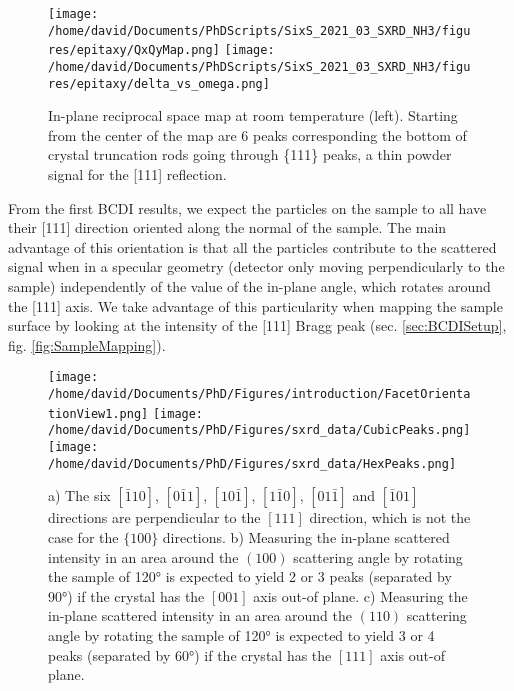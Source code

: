 \begin{figure}[!htb]
    \centering
    \texttt{[image: /home/david/Documents/PhDScripts/SixS\_2021\_03\_SXRD\_NH3/figures/epitaxy/QxQyMap.png]}
    \texttt{[image: /home/david/Documents/PhDScripts/SixS\_2021\_03\_SXRD\_NH3/figures/epitaxy/delta\_vs\_omega.png]}
    \caption{
        In-plane reciprocal space map at room temperature (left).
        Starting from the center of the map are 6 peaks corresponding the bottom of crystal truncation rods going through \{111\} peaks, a thin powder signal for the [111] reflection.
    }
    \label{fig:QxQyMap}
\end{figure}

From the first BCDI results, we expect the particles on the sample to all have their [111] direction oriented along the normal of the sample.
The main advantage of this orientation is that all the particles contribute to the scattered signal when in a specular geometry (detector only moving perpendicularly to the sample) independently of the value of the in-plane angle, which rotates around the [111] axis.
We take advantage of this particularity when mapping the sample surface by looking at the intensity of the [111] Bragg peak (sec. \ref{sec:BCDISetup}, fig. \ref{fig:SampleMapping}).

\begin{figure}[!htb]
    \centering
    \texttt{[image: /home/david/Documents/PhD/Figures/introduction/FacetOrientationView1.png]}
    \texttt{[image: /home/david/Documents/PhD/Figures/sxrd\_data/CubicPeaks.png]}
    \texttt{[image: /home/david/Documents/PhD/Figures/sxrd\_data/HexPeaks.png]}
    \caption{
        a) The six $[\bar{1}10]$, $[0\bar{1}1]$, $[10\bar{1}]$, $[1\bar{1}0]$, $[01\bar{1}]$ and $[\bar{1}01]$ directions are perpendicular to the $[111]$ direction, which is not the case for the $\{100\}$ directions.
        b) Measuring the in-plane scattered intensity in an area around the $(100)$ scattering angle by rotating the sample of \ang{120} is expected to yield 2 or 3 peaks (separated by \ang{90}) if the crystal has the $[001]$ axis out-of plane.
        c) Measuring the in-plane scattered intensity in an area around the $(110)$ scattering angle by rotating the sample of \ang{120} is expected to yield 3 or 4 peaks (separated by \ang{60}) if the crystal has the $[111]$ axis out-of plane.
    }
    \label{fig:Orientations}
\end{figure}

